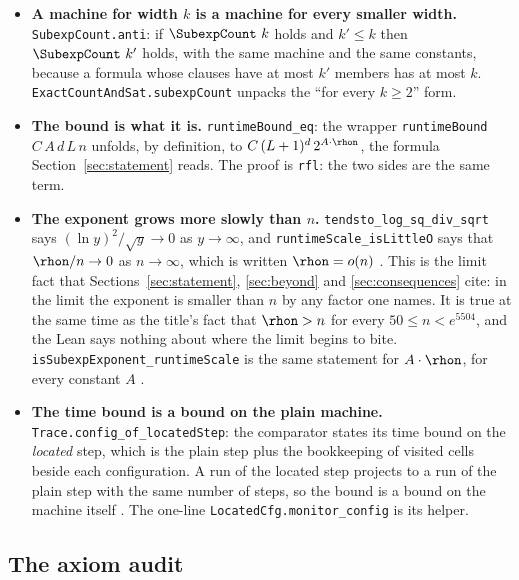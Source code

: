 \begin{itemize}
\item \textbf{A machine for width $k$ is a machine for every smaller
  width.} \texttt{SubexpCount.anti}: if \(\SubexpCount\ k\) holds and
  $k' \le k$ then \(\SubexpCount\ k'\) holds, with the same machine and
  the same constants, because a formula whose clauses have at most $k'$
  members has at most $k$. \texttt{ExactCountAndSat.subexpCount} unpacks
  the ``for every $k \ge 2$'' form.
\item \textbf{The bound is what it is.} \texttt{runtimeBound\_eq}: the
  wrapper \texttt{runtimeBound} $C\,A\,d\,L\,n$ unfolds, by definition,
  to $C\,(L+1)^d\,2^{A\cdot\rhon}$, the formula
  Section~\ref{sec:statement} reads. The proof is \texttt{rfl}: the two
  sides are the same term.
\item \textbf{The exponent grows more slowly than $n$.}
  \texttt{tendsto\_log\_sq\_div\_sqrt} says $(\ln y)^2/\sqrt{y} \to 0$
  as $y \to \infty$, and \texttt{runtimeScale\_isLittleO} says that
  $\rhon/n \to 0$ as $n \to \infty$, which is written $\rhon = o(n)$
  . This is the limit fact that
  Sections~\ref{sec:statement}, \ref{sec:beyond} and
  \ref{sec:consequences} cite: in the limit the exponent is smaller than
  $n$ by any factor one names. It is true at the same time as the
  title's fact that $\rhon > n$ for every $50 \le n < e^{5504}$, and the
  Lean says nothing about where the limit begins to bite.
  \texttt{isSubexpExponent\_runtimeScale} is the same statement for
  $A \cdot \rhon$, for every constant $A$ .
\item \textbf{The time bound is a bound on the plain machine.}
  \texttt{Trace.config\_of\_locatedStep}: the comparator states its time bound on the \emph{located} step, which is the plain step plus the bookkeeping of visited cells beside each configuration. A run of the located step projects to a run of the
  plain step with the same number of steps, so the bound is a bound on
  the machine itself . The one-line
  \texttt{LocatedCfg.monitor\_config} is its helper.
\end{itemize}

\subsection{The axiom audit}
\label{sec:lean-audit}

